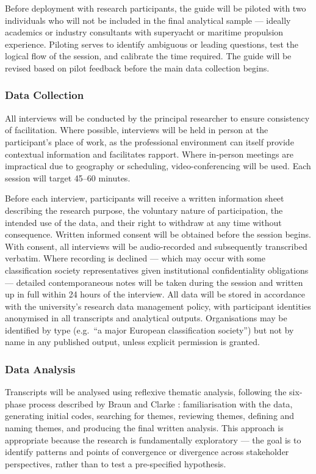 \documentclass[12pt]{article}
\begin{document}
Before deployment with research participants, the guide will be piloted with two 
individuals who will not be included in the final analytical sample --- ideally 
academics or industry consultants with superyacht or maritime propulsion experience. 
Piloting serves to identify ambiguous or leading questions, test the logical flow of 
the session, and calibrate the time required. The guide will be revised based on 
pilot feedback before the main data collection begins.

\subsubsection*{Data Collection}

All interviews will be conducted by the principal researcher to ensure consistency 
of facilitation. Where possible, interviews will be held in person at the 
participant's place of work, as the professional environment can itself provide 
contextual information and facilitates rapport. Where in-person meetings are 
impractical due to geography or scheduling, video-conferencing will be used. Each 
session will target 45--60 minutes.

Before each interview, participants will receive a written information sheet 
describing the research purpose, the voluntary nature of participation, the intended 
use of the data, and their right to withdraw at any time without consequence. 
Written informed consent will be obtained before the session begins. With consent, 
all interviews will be audio-recorded and subsequently transcribed verbatim. Where 
recording is declined --- which may occur with some classification society 
representatives given institutional confidentiality obligations --- detailed 
contemporaneous notes will be taken during the session and written up in full within 
24 hours of the interview. All data will be stored in accordance with the 
university's research data management policy, with participant identities anonymised 
in all transcripts and analytical outputs. Organisations may be identified by type 
(e.g.\ ``a major European classification society'') but not by name in any published 
output, unless explicit permission is granted.

\subsubsection*{Data Analysis}

Transcripts will be analysed using reflexive thematic analysis, following the 
six-phase process described by Braun and Clarke \cite{braun2006}: familiarisation 
with the data, generating initial codes, searching for themes, reviewing themes, 
defining and naming themes, and producing the final written analysis. This approach 
is appropriate because the research is fundamentally exploratory --- the goal is to 
identify patterns and points of convergence or divergence across stakeholder 
perspectives, rather than to test a pre-specified hypothesis.
\end{document}
